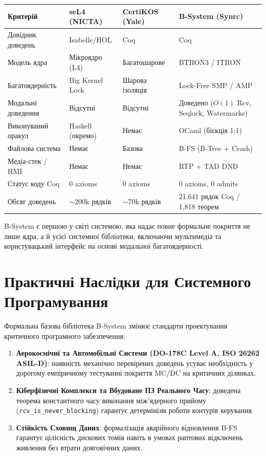 \documentclass{article}
\begin{document}
\begin{center}
\begin{longtable}{@{}p{3.8cm}p{3.0cm}p{3.0cm}p{3.2cm}@{}}
\toprule
\textbf{Критерій} & \textbf{seL4 (NICTA)} & \textbf{CertiKOS (Yale)} & \textbf{B-System (Synrc)} \\
\midrule
\endhead
Довідник доведень & Isabelle/HOL & Coq & Coq \\
Модель ядра & Мікроядро (L4) & Багатошарове & BTRON3 / ITRON \\
Багатоядерність & Big Kernel Lock & Шарова ізоляція & Lock-Free SMP / AMP \\
Модальні доведення & Відсутні & Відсутні & Доведено ($O(1)$ Rcv, Seqlock, Watermarks) \\
Виконуваний оракул & Haskell (окремо) & Немає & OCaml (бієкція 1:1) \\
Файлова система & Немає & Базова & B-FS (B-Tree + Crash) \\
Медіа-стек / HMI & Немає & Немає & RTP + TAD DND \\
Статус коду Coq & 0 axioms & 0 axioms & 0 axioms, 0 admits \\
Обсяг доведень & $\sim$200k рядків & $\sim$70k рядків & 21,641 рядок Coq / 1,818 теорем \\
\bottomrule
\end{longtable}
\end{center}

B-System є першою у світі системою, яка надає повне формальне покриття не лише ядра, а й усієї системної бібліотеки, включаючи мультимедіа та користувацький інтерфейс на основі модальної багатоядерності.

\section{Практичні Наслідки для Системного Програмування}

Формальна базова бібліотека B-System змінює стандарти проектування критичного програмного забезпечення:
\begin{enumerate}
  \item \textbf{Аерокосмічні та Автомобільні Системи (DO-178C Level A, ISO 26262 ASIL-D)}: наявність механічно перевірених доведень усуває необхідність у дорогому емпіричному тестуванні покриття MC/DC на критичних ділянках.
  \item \textbf{Кіберфізичні Комплекси та Вбудоване ПЗ Реального Часу}: доведена теорема константного часу виконання між'ядерного прийому (\texttt{rcv\_is\_never\_blocking}) гарантує детермінізм роботи контурів керування.
  \item \textbf{Стійкість Сховищ Даних}: формалізація аварійного відновлення B-FS гарантує цілісність дискових томів навіть в умовах раптових відключень живлення без втрати довговічних даних.
\end{enumerate}
\end{document}
